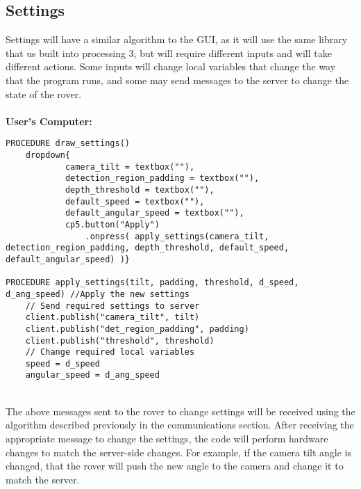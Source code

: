 \documentclass[11pt]{report}
\begin{document}
\newpage
\subsection{Settings}
Settings will have a similar algorithm to the GUI, as it will use the same library that us built into processing 3, but will require different inputs and will take different actions. Some inputs will change local variables that change the way that the program runs, and some may send messages to the server to change the state of the rover.
\\\\
\textbf{User's Computer:}
\begin{lstlisting}
PROCEDURE draw_settings()
	dropdown{
			camera_tilt = textbox(""),
			detection_region_padding = textbox(""),
			depth_threshold = textbox(""),
			default_speed = textbox(""),
			default_angular_speed = textbox(""),
			cp5.button("Apply")
				.onpress( apply_settings(camera_tilt, detection_region_padding, depth_threshold, default_speed, default_angular_speed) )}
				
PROCEDURE apply_settings(tilt, padding, threshold, d_speed, d_ang_speed) //Apply the new settings
	// Send required settings to server
	client.publish("camera_tilt", tilt)
	client.publish("det_region_padding", padding)
	client.publish("threshold", threshold)
	// Change required local variables
	speed = d_speed
	angular_speed = d_ang_speed
\end{lstlisting}
\noindent
\\
The above messages sent to the rover to change settings will be received using the algorithm described previously in the communications section. After receiving the appropriate message to change the settings, the code will perform hardware changes to match the server-side changes. For example, if the camera tilt angle is changed, that the rover will push the new angle to the camera and change it to match the server.
\end{document}
